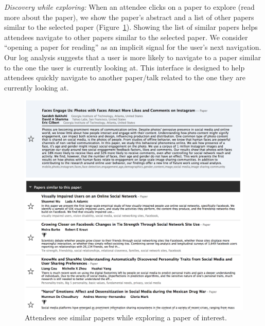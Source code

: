 \documentclass{sigchi}
\begin{document}
\emph{Discovery while exploring:} When an attendee clicks on a paper to explore (read more about the paper), we show the paper's abstract and a list of other papers similar to the selected paper (Figure~\ref{confer-similar-papers}). Showing the list of similar papers helps attendees navigate to other papers similar to the selected paper. We consider ``opening a paper for reading'' as an implicit signal for the user's next navigation. Our log analysis suggests that a user is more likely to navigate to a paper similar to the one the user is currently looking at. This interface is designed to help attendees quickly navigate to another paper/talk related to the one they are currently looking at.
\begin{figure}[!h]
\centering
\includegraphics[width=0.95\columnwidth]{confer-similar-papers.png}
\caption{Attendees see similar papers while exploring a paper of interest.}
\label{confer-similar-papers}
\end{figure}
\end{document}
